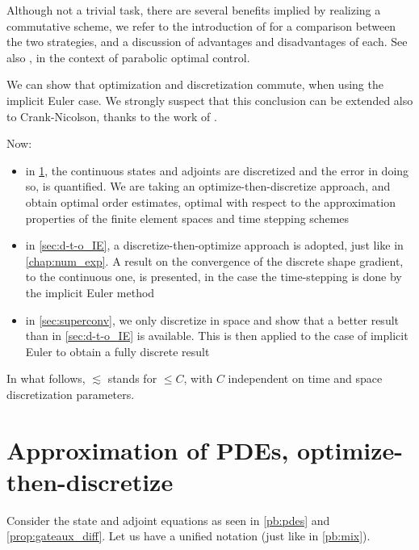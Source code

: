 \documentclass[english,a4paper,9pt,oneside]{scrbook}	%
\theoremstyle{break}
\theoremstyle{remark}
\begin{document}
Although not a trivial task, there are several benefits implied by realizing a commutative scheme, we refer to the introduction of \cite{liu} for a comparison between the two strategies, and a discussion of advantages and disadvantages of each. See also \cite{flaig}, in the context of parabolic optimal control.

We can show that optimization and discretization commute, when using the implicit Euler case. We strongly suspect that this conclusion can be extended also to Crank-Nicolson, thanks to the work of \cite{flaig}.

Now:

\begin{itemize}
	\item in \cref{sec:o-t-d}, the continuous states and adjoints are discretized and the error in doing so, is quantified. We are taking an optimize-then-discretize approach, and obtain optimal order estimates, optimal with respect to the approximation properties of the finite element spaces and time stepping schemes
	\item in \cref{sec:d-t-o_IE}, a discretize-then-optimize approach is adopted, just like in \cref{chap:num_exp}. A result on the convergence of the discrete shape gradient, to the continuous one, is presented, in the case the time-stepping is done by the implicit Euler method
	\item in \cref{sec:superconv}, we only discretize in space and show that a better result than in \cref{sec:d-t-o_IE} is available. This is then applied to the case of implicit Euler to obtain a fully discrete result
	

\end{itemize}

In what follows, $\lesssim$ stands for $\leq C$, with $C$ independent on time and space discretization parameters.

\section{Approximation of PDEs, optimize-then-discretize}
\label{sec:o-t-d}

Consider the state and adjoint equations as seen in \cref{pb:pdes} and \cref{prop:gateaux_diff}. Let us have a unified notation (just like in \cref{pb:mix}).
\end{document}
